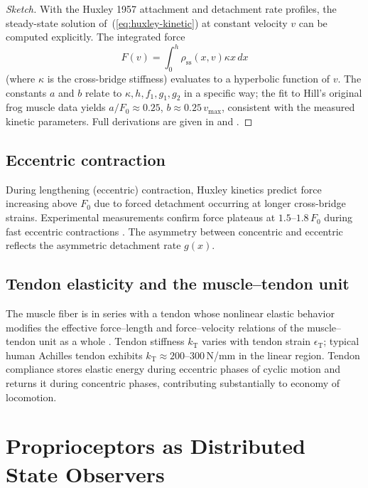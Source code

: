 \documentclass[11pt,twocolumn,a4paper]{article}
\theoremstyle{definition}
\theoremstyle{remark}
\begin{document}
\begin{proof}[Sketch]
With the Huxley 1957 attachment and detachment rate profiles, the
steady-state solution of~(\ref{eq:huxley-kinetic}) at constant
velocity $v$ can be computed explicitly. The integrated force
\begin{equation}
F(v) = \int_0^{h} \rho_{\mathrm{ss}}(x, v) \kappa x \,dx
\end{equation}
(where $\kappa$ is the cross-bridge stiffness) evaluates to a
hyperbolic function of $v$. The constants $a$ and $b$ relate to
$\kappa, h, f_1, g_1, g_2$ in a specific way; the fit to Hill's
original frog muscle data yields $a/F_0 \approx 0.25$, $b \approx
0.25\,v_{\max}$, consistent with the measured kinetic parameters.
Full derivations are given in \citet{zahalak1981} and \citet{julian1969}.
\end{proof}

\subsection{Eccentric contraction}

During lengthening (eccentric) contraction, Huxley kinetics predict
force increasing above $F_0$ due to forced detachment occurring at
longer cross-bridge strains. Experimental measurements confirm force
plateaus at $1.5$--$1.8\,F_0$ during fast eccentric contractions
\citep{katz1939}. The asymmetry between concentric and eccentric
reflects the asymmetric detachment rate $g(x)$.

\subsection{Tendon elasticity and the muscle--tendon unit}

The muscle fiber is in series with a tendon whose nonlinear elastic
behavior modifies the effective force--length and force--velocity
relations of the muscle--tendon unit as a whole \citep{alexander1990,%
zajac1989}. Tendon stiffness $k_{\mathrm{T}}$ varies with tendon
strain $\epsilon_{\mathrm{T}}$; typical human Achilles tendon exhibits
$k_{\mathrm{T}} \approx 200$--$300$\,N/mm in the linear region.
Tendon compliance stores elastic energy during eccentric phases of
cyclic motion and returns it during concentric phases, contributing
substantially to economy of locomotion.


\section{Proprioceptors as Distributed State Observers}
\label{sec:proprioceptors}
\end{document}
